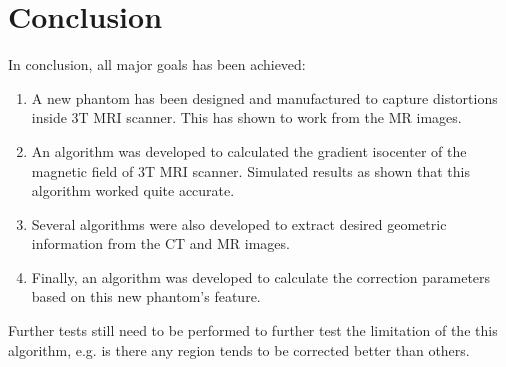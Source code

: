 \section{Conclusion}

In conclusion, all major goals has been achieved:
\begin{enumerate}
\item A new phantom has been designed and manufactured to capture distortions inside 3T MRI scanner. This has 
  shown to work from the MR images.
\item An algorithm was developed to calculated the gradient isocenter of the magnetic field of 3T MRI scanner. 
  Simulated results as shown that this algorithm worked quite accurate.
\item Several algorithms were also developed to extract desired geometric information from the CT and MR images.
\item Finally, an algorithm was developed to calculate the correction parameters based on this new phantom's 
  feature.
\end{enumerate}

Further tests still need to be performed to further test the limitation of the this algorithm, e.g. is there
any region tends to be corrected better than others.